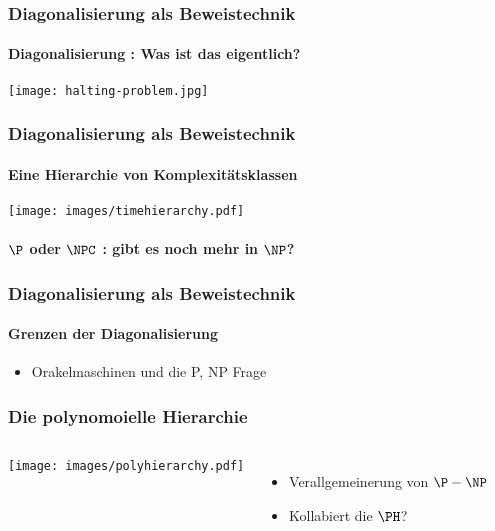 \begin{frame}
	\frametitle{Diagonalisierung als Beweistechnik}
	\framesubtitle{Diagonalisierung : Was ist das eigentlich?}
	
	\texttt{[image: halting-problem.jpg]}
\end{frame}
\begin{frame}
	\frametitle{Diagonalisierung als Beweistechnik}
	\framesubtitle{Eine Hierarchie von Komplexitätsklassen}
	\texttt{[image: images/timehierarchy.pdf]}
\end{frame}
\begin{frame}
	\framesubtitle{$\P$ oder $\NPC$ : gibt es noch mehr in $\NP$?}
\end{frame}
\begin{frame}
	\frametitle{Diagonalisierung als Beweistechnik}
	\framesubtitle{Grenzen der Diagonalisierung}
	
	\begin{itemize}[<+->]
	  \item Orakelmaschinen und die P, NP Frage
	\end{itemize}
\end{frame}
\begin{frame}
	\frametitle{Die polynomoielle Hierarchie}
	\begin{columns}
		\texttt{[image: images/polyhierarchy.pdf]}
		\begin{itemize}[<+->]
			\item Verallgemeinerung von $\P-\NP$
			\item Kollabiert die $\PH$?
		\end{itemize}
	\end{columns}	
	\end{frame}
	
	